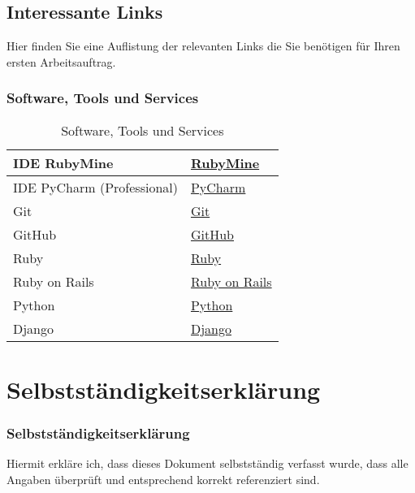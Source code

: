 \subsection{Interessante Links}\label{subsec:projekt}
\begin{frame}[fragile]
    Hier finden Sie eine Auflistung der relevanten Links die Sie benötigen für Ihren ersten Arbeitsauftrag.
\end{frame}


\begin{frame}[fragile]
    \frametitle<presentation>{Software, Tools und Services}
    \begin{table}[h!]
        \centering
        \begin{tabularx}{0.8\textwidth} {
        | >{\raggedright\arraybackslash}X
        | >{\raggedright\arraybackslash}X | }
            \hline
            IDE RubyMine & \href{https://www.jetbrains.com/de-de/ruby/}{RubyMine} \\
            \hline
            IDE PyCharm (Professional) & \href{https://www.jetbrains.com/de-de/pycharm/}{PyCharm} \\
            \hline
            Git & \href{https://git-scm.com/}{Git} \\
            \hline
            GitHub & \href{https://github.com/}{GitHub} \\
            \hline
            Ruby & \href{https://www.ruby-lang.org/de/}{Ruby} \\
            \hline
            Ruby on Rails & \href{https://guides.rubyonrails.org/index.html}{Ruby on Rails} \\
            \hline
            Python & \href{https://www.python.org/}{Python} \\
            \hline
            Django & \href{https://www.djangoproject.com/}{Django} \\
            \hline
        \end{tabularx}
        \caption{Software, Tools und Services}
        \label{tab:2}
    \end{table}
\end{frame}




\section{Selbstständigkeitserklärung}\label{sec:ssk}
\begin{frame}[fragile]
    \frametitle<presentation>{Selbstständigkeitserklärung}
    Hiermit erkläre ich, dass dieses Dokument selbstständig verfasst wurde, dass alle Angaben
    überprüft und entsprechend korrekt referenziert sind.
    \gitAuthorDate~\gitAuthorName
\end{frame}


